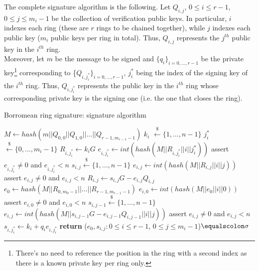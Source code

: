 The complete signature algorithm is the following. Let $Q_{i,j}$, $0 \leq i \leq r-1$, $0 \leq j \leq m_i-1$ be the collection of verification public keys. In particular, $i$ indexes each ring (these are $r$ rings to be chained together), while $j$ indexes each public key ($m_i$ public keys per ring in total). Thus, $Q_{i,j}$ represents the $j^{th}$ public key in the $i^{th}$ ring.\\
Moreover, let $m$ be the message to be signed and $\{q_i\}_{i=0,\dots,r-1}$ be the private key\footnote{There's no need to reference the position in the ring with a second index as there is a known private key per ring only.} corresponding to \{$Q_{i,j_i^{*}}\}_{i=0,\dots,r-1}$, $j_i^{*}$ being the index of the signing key of the $i^{th}$ ring. Thus, $Q_{i,j_i^{*}}$ represents the public key in the $i^{th}$ ring whose corresponding private key is the signing one (i.e. the one that closes the ring).
\begin{algorithm}[H]
	\caption{Borromean ring signature: signature algorithm}
	\label{alg:Borromean_sign}
	\begin{algorithmic}[1]
		\State $M \gets hash(m||Q_{0,0}||Q_{1,0}||\dots||Q_{r-1,m_{r-1}-1})$
		\State $k_i$ $\xleftarrow{\text{\$}} \{1, ..., n - 1\}$
		\State $j_i^{*}$ $\xleftarrow{\text{\$}} \{0, ..., m_i - 1\}$
		\State $R_{i,j_i^{*}} \gets k_iG$
		\State $e_{i,j_i^{*}} \gets int(hash(M||R_{i,j_i^{*}}||i||j_i^{*}))$
		\State assert $e_{i,j_i^{*}} \neq 0$ and $e_{i,j_i^{*}} < n$
		\State $s_{i,j} \xleftarrow{\text{\$}} \{1, ..., n - 1\}$
		\State $e_{i,j} \gets int(hash(M||R_{i,j}||i||j))$
		\State assert $e_{i,j} \neq 0$ and $e_{i,j} < n$
		\State $R_{i,j} \gets s_{i,j}G - e_{i,j}Q_{i,j}$
		\EndFor
		\EndIf
		\EndFor
		\State $e_0 \gets hash(M||R_{0,m_0-1}||\dots||R_{r-1,m_{r-1}-1})$
		\State $e_{i,0} \gets int(hash(M||e_0||i||0))$
		\State assert $e_{i,0} \neq 0$ and $e_{i,0} < n$
		\State $s_{i,j-1} \xleftarrow{\text{\$}} \{1, ..., n - 1\}$
		\State $e_{i,j} \gets int(hash(M|| s_{i,j-1}G - e_{i,j-1}Q_{i,j-1}||i||j))$
		\State assert $e_{i,j} \neq 0$ and $e_{i,j} < n$
		\EndFor
		\State $s_{i,j_i^{*}} \gets k_i + q_ie_{i,j_i^{*}}$
		\EndFor
		\State \textbf{return} ($e_0, s_{i,j}: 0 \leq i \leq r-1$, $0 \leq j \leq m_i-1$)$\equalscolon \sigma$
		\EndProcedure
	\end{algorithmic}
\end{algorithm}
